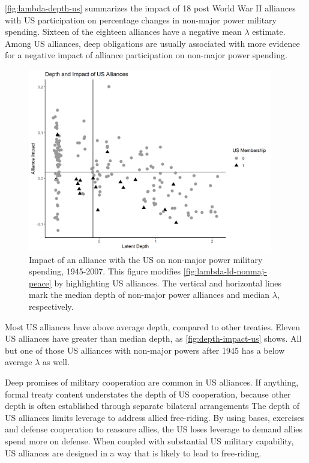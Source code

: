 \documentclass[12pt]{article}
\begin{document}
\autoref{fig:lambda-depth-us} summarizes the impact of 18 post World War II alliances with US participation on percentage changes in non-major power military spending.
Sixteen of the eighteen alliances have a negative mean $\lambda$ estimate. 
Among US alliances, deep obligations are usually associated with more evidence for a negative impact of alliance participation on non-major power spending. 


\begin{figure}[htbp]
	\centering
		\includegraphics[width=0.95\textwidth]{../figures/lambda-depth-us.png}
	\caption{Impact of an alliance with the US on non-major power military spending, 1945-2007. This figure modifies \autoref{fig:lambda-ld-nonmaj-peace} by highlighting US alliances. The vertical and horizontal lines mark the median depth of non-major power alliances and median $\lambda$, respectively.}
	\label{fig:depth-impact-us}
\end{figure}

Most US alliances have above average depth, compared to other treaties. 
Eleven US alliances have greater than median depth, as \autoref{fig:depth-impact-us} shows. 
All but one of those US alliances with non-major powers after 1945 has a below average $\lambda$ as well. 


Deep promises of military cooperation are common in US alliances. 
If anything, formal treaty content understates the depth of US cooperation, because other depth is often established through separate bilateral arrangements  
The depth of US alliances limits leverage to address allied free-riding. 
By using bases, exercises and defense cooperation to reassure allies, the US loses leverage to demand allies spend more on defense. 
When coupled with substantial US military capability, US alliances are designed in a way that is likely to lead to free-riding. 
\end{document}
